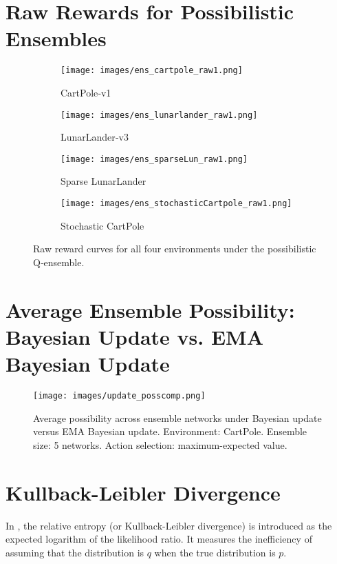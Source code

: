 \documentclass[11pt,a4paper]{report}
\begin{document}
\section*{Raw Rewards for Possibilistic Ensembles} \label{sec:posens-raw}
\begin{figure}[H]
  \centering
  \begin{subfigure}[b]{0.45\textwidth}
    \texttt{[image: images/ens\_cartpole\_raw1.png]}
    \caption{CartPole‐v1}
  \end{subfigure}
  \hfill
  \begin{subfigure}[b]{0.45\textwidth}
    \texttt{[image: images/ens\_lunarlander\_raw1.png]}
    \caption{LunarLander‐v3}
  \end{subfigure}
  \vspace{1em}

  \begin{subfigure}[b]{0.45\textwidth}
    \texttt{[image: images/ens\_sparseLun\_raw1.png]}
    \caption{Sparse LunarLander}
  \end{subfigure}
  \hfill
  \begin{subfigure}[b]{0.45\textwidth}
    \texttt{[image: images/ens\_stochasticCartpole\_raw1.png]}
    \caption{Stochastic CartPole}
  \end{subfigure}

  \caption{Raw reward curves for all four environments under the possibilistic Q‐ensemble.}
  \label{fig:ens_raw}
\end{figure}
\section*{Average Ensemble Possibility: Bayesian Update vs. EMA Bayesian Update} \label{appendix:ens_poss_cmp}

\begin{figure}[H]
    \centering
    \texttt{[image: images/update\_posscomp.png]}
    \caption{
        Average possibility across ensemble networks under Bayesian update versus EMA Bayesian update.
        Environment: CartPole. Ensemble size: 5 networks. Action selection: maximum-expected value.
    }
\end{figure}
  
\section*{Kullback-Leibler Divergence} \label{appendix:kl}
In \cite{cover1991}, the relative entropy (or Kullback-Leibler divergence) is introduced as the expected logarithm of the likelihood ratio. It measures the inefficiency of assuming that the distribution is \(q\) when the true distribution is \(p\). 
\end{document}
